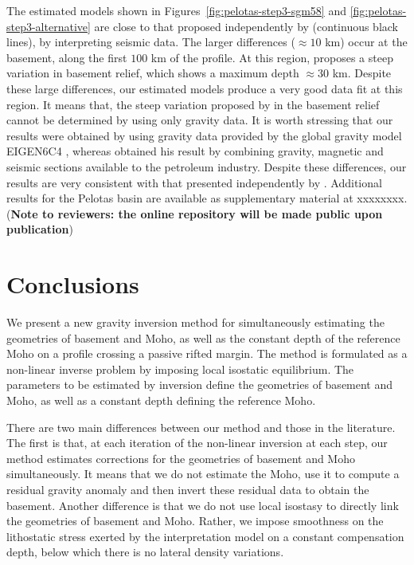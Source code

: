\documentclass[manuscript]{geophysics}
\begin{document}
The estimated models shown in Figures~\ref{fig:pelotas-step3-sgm58} and \ref{fig:pelotas-step3-alternative} 
are close to that proposed independently by \citet{zalan2015} (continuous black lines), by
interpreting seismic data.
The larger differences ($\approx 10$ km) occur at the basement, along the first 
$100$ km of the profile.
At this region, \citeauthor{zalan2015} proposes a steep variation in basement
relief, which shows a maximum depth $\approx 30$ km. 
Despite these large differences,
our estimated models produce a very good data fit
at this region. It means that, the steep variation 
proposed by \citeauthor{zalan2015} in the basement relief cannot be determined by 
using only gravity data.
It is worth stressing that our results were obtained by using gravity data
provided by the global gravity model EIGEN6C4 \citep{forste2014}, whereas 
\citet{zalan2015} obtained his result by combining gravity, magnetic and seismic sections
available to the petroleum industry. Despite these differences, our results are very 
consistent with that presented independently by \citet{zalan2015}.
Additional results for the Pelotas basin are available as supplementary material at xxxxxxxx.
(\textbf{Note to reviewers: the online repository 
will be made public upon
publication})


\section{Conclusions}

We present a new gravity inversion method for simultaneously estimating the 
geometries of basement and Moho, as well as the constant depth of the reference 
Moho on a profile crossing a passive rifted margin.
The method is formulated as a non-linear inverse problem by imposing local
isostatic equilibrium.
The parameters to be estimated by inversion define the geometries of basement and Moho, 
as well as a constant depth defining the reference Moho.

There are two main differences between our method and those in the literature.
The first is that, at each iteration of the non-linear inversion at each step, 
our method estimates corrections for the geometries of basement and Moho simultaneously. 
It means that we do not estimate the Moho, use it to compute a residual gravity anomaly
and then invert these residual data to obtain the basement.
Another difference is that we do not use local isostasy to directly link
the geometries of basement and Moho.
Rather, we impose smoothness on the lithostatic stress exerted by the interpretation 
model on a constant compensation depth, below which there is no lateral density variations.
\end{document}
